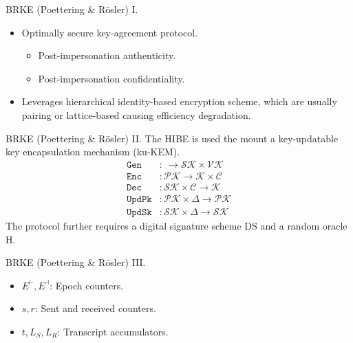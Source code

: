 \documentclass{beamer}
\begin{document}
\begin{frame}{BRKE (Poettering \& Rösler) I.}
  \begin{itemize}
  \item Optimally secure key-agreement protocol.
    \begin{itemize}
    \item Post-impersonation authenticity.
    \item Post-impersonation confidentiality.
    \end{itemize}
  \item Leverages hierarchical identity-based encryption scheme,
    which are usually pairing or lattice-based causing efficiency degradation.
  \end{itemize}
\end{frame}

\begin{frame}{BRKE (Poettering \& Rösler) II.}
  The HIBE is used the mount a key-updatable key encapsulation mechanism (ku-KEM).
  \begin{align*}
    \texttt{Gen} & : \ \rightarrow \mathcal{SK} \times \mathcal{VK} \\
    \texttt{Enc} & : \mathcal{PK} \rightarrow \mathcal{K} \times \mathcal{C} \\ 
    \texttt{Dec} & : \mathcal{SK} \times \mathcal{C} \rightarrow \mathcal{K} \\
    \texttt{UpdPk} & : \mathcal{PK} \times \Delta \rightarrow \mathcal{PK} \\
    \texttt{UpdSk} & : \mathcal{SK} \times \Delta \rightarrow \mathcal{SK}
  \end{align*}
  The protocol further requires a digital signature scheme DS and a random
  oracle H.
\end{frame}

\begin{frame}{BRKE (Poettering \& Rösler) III.}
  \scriptsize
   \begin{minipage}[h]{0.59\textwidth}
      \begin{figure}[h]
        \centering
        \setlength{\fboxsep}{10pt}
        \scalebox{0.7}{%
        \fbox{%
          
        }
      }
    \end{figure}
    \end{minipage}
   \begin{minipage}[h]{0.40\textwidth}
      \begin{itemize}
      \item $E^\vdash,E^\dashv$: Epoch counters.
      \item $s, r$: Sent and received counters.
      \item $t, L_S, L_R$: Transcript accumulators.
      \end{itemize}
  \end{minipage}
\end{frame}
\end{document}
